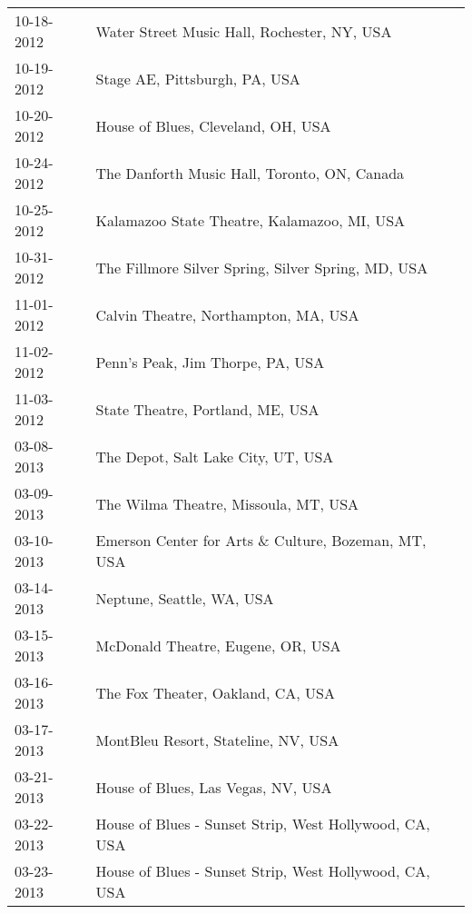 \begin{supertabular}{ll}
 10-18-2012 &             Water Street Music Hall, Rochester, NY, USA \\
 10-19-2012 &                           Stage AE, Pittsburgh, PA, USA \\
 10-20-2012 &                      House of Blues, Cleveland, OH, USA \\
 10-24-2012 &            The Danforth Music Hall, Toronto, ON, Canada \\
 10-25-2012 &             Kalamazoo State Theatre, Kalamazoo, MI, USA \\
 10-31-2012 &      The Fillmore Silver Spring, Silver Spring, MD, USA \\
 11-01-2012 &                    Calvin Theatre, Northampton, MA, USA \\
 11-02-2012 &                        Penn's Peak, Jim Thorpe, PA, USA \\
 11-03-2012 &                        State Theatre, Portland, ME, USA \\
 03-08-2013 &                      The Depot, Salt Lake City, UT, USA \\
 03-09-2013 &                    The Wilma Theatre, Missoula, MT, USA \\
 03-10-2013 &     Emerson Center for Arts \& Culture, Bozeman, MT, USA \\
 03-14-2013 &                               Neptune, Seattle, WA, USA \\
 03-15-2013 &                       McDonald Theatre, Eugene, OR, USA \\
 03-16-2013 &                       The Fox Theater, Oakland, CA, USA \\
 03-17-2013 &                     MontBleu Resort, Stateline, NV, USA \\
 03-21-2013 &                      House of Blues, Las Vegas, NV, USA \\
 03-22-2013 &  House of Blues - Sunset Strip, West Hollywood, CA, USA \\
 03-23-2013 &  House of Blues - Sunset Strip, West Hollywood, CA, USA \\
\end{supertabular}
